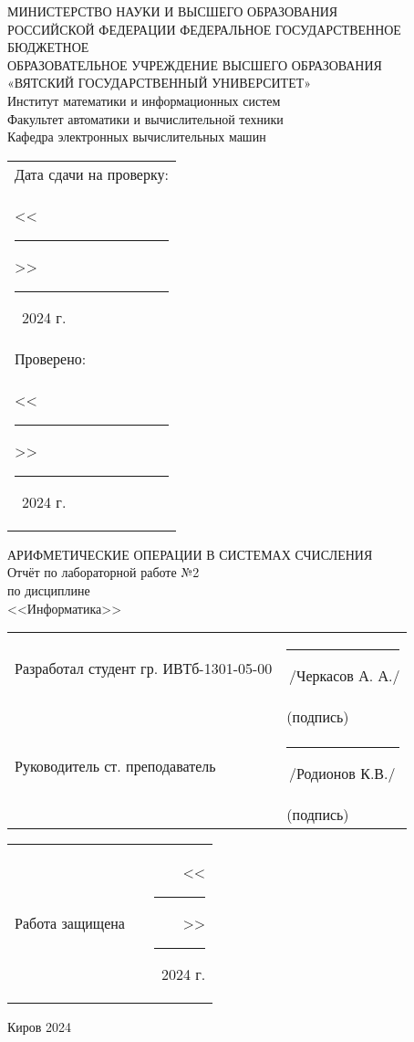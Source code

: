 \documentclass[oneside,a4paper,14pt]{extarticle}
\begin{document}
  
\newpage\thispagestyle{empty}
  \begin{center}
      МИНИСТЕРСТВО НАУКИ И ВЫСШЕГО ОБРАЗОВАНИЯ\\
      РОССИЙСКОЙ ФЕДЕРАЦИИ
      ФЕДЕРАЛЬНОЕ ГОСУДАРСТВЕННОЕ БЮДЖЕТНОЕ\\
      ОБРАЗОВАТЕЛЬНОЕ
      УЧРЕЖДЕНИЕ ВЫСШЕГО ОБРАЗОВАНИЯ\\
      «ВЯТСКИЙ ГОСУДАРСТВЕННЫЙ УНИВЕРСИТЕТ»\\
      Институт математики и информационных систем\\
      Факультет автоматики и вычислительной техники\\
      Кафедра электронных вычислительных машин
  \end{center}
  \vspace{10mm}
  
  \hfill
  \begin{tabular}{l}
    \footnotesize Дата сдачи на проверку: \\
    \footnotesize <<\rule[-1mm]{5mm}{0.10mm}\/>>\rule[-1mm]{20mm}{0.10mm}\ 2024 г.\\
    \footnotesize Проверено: \\
    \footnotesize <<\rule[-1mm]{5mm}{0.10mm}\/>>\rule[-1mm]{20mm}{0.10mm}\ 2024 г. \\
  \end{tabular}
  \vfill
  
  \begin{center}
    АРИФМЕТИЧЕСКИЕ ОПЕРАЦИИ В СИСТЕМАХ СЧИСЛЕНИЯ\\
    Отчёт по лабораторной работе №2\\
    по дисциплине\\
    <<Информатика>>\\
  \end{center}
  \vspace{40mm}

  \noindent
  \begin{tabular}{ll}
    Разработал студент гр. ИВТб-1301-05-00 & \rule[-1mm]{30mm}{0.10mm}\,/Черкасов А. А./\\
    & \hspace{8mm}\footnotesize(подпись)\\
     
    Руководитель ст. преподаватель & \rule[-1mm]{30mm}{0.10mm}\,/Родионов К.В./\\
    & \hspace{8mm}\footnotesize(подпись)\\
  \end{tabular}
  
  \noindent
  \begin{tabular}{lp{58mm}r}
    Работа защищена &  & <<\rule[-1mm]{5mm}{0.10mm}\/>>\rule[-1mm]{30mm}{0.10mm}\ 2024 г.
  \end{tabular}
  \vfill
  
  \begin{center}
    Киров 2024
  \end{center}
  
\end{document}
